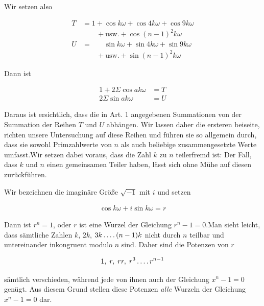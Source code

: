 Wir setzen also

\[
\begin{aligned}
T&=1+\cos k\omega+\cos4k\omega+\cos9k\omega\\&\qquad+\text{usw.}+\cos(n-1)^2k\omega\\
U&=\phantom{1+}\sin k\omega+\sin4k\omega+\sin9k\omega\\&\qquad+\text{usw.}+\sin(n-1)^2k\omega
\end{aligned}
\]

Dann ist

\[
\begin{aligned}
1+2\Sigma\cos ak\omega&=T\\
2\Sigma\sin ak\omega&=U
\end{aligned}
\]

Daraus ist ersichtlich, dass die in Art. 1 angegebenen Summationen von der Summation der Reihen $T$ und $U$ abhängen. Wir lassen daher die ersteren beiseite, richten unsere Untersuchung auf diese Reihen und führen sie so allgemein durch, dass sie sowohl Primzahlwerte von $n$ als auch beliebige zusammengesetzte Werte umfasst.\quad Wir setzen dabei voraus, dass die Zahl $k$ zu $n$ teilerfremd ist: Der Fall, dass $k$ und $n$ einen gemeinsamen Teiler haben, lässt sich ohne Mühe auf diesen zurückführen.


Wir bezeichnen die imaginäre Größe $\surd{-1}$ mit $i$ und setzen

\[
\begin{aligned}
\cos k\omega+i\sin k\omega=r
\end{aligned}
\]

Dann ist $r^n=1$, oder $r$ ist eine Wurzel der Gleichung $r^n-1=0$.\quad Man sieht leicht, dass sämtliche Zahlen $k$, $2k$, $3k\mathinner{.\,.\,.\,.}(n-1)k$ nicht durch $n$ teilbar und untereinander inkongruent modulo $n$ sind. Daher sind die Potenzen von $r$

\[
\begin{aligned}
1,\;r,\;rr,\;r^3\mathinner{.\,.\,.\,.} r^{n-1}
\end{aligned}
\]

sämtlich verschieden, während jede von ihnen auch der Gleichung $x^n-1=0$ genügt. Aus diesem Grund stellen diese Potenzen \emph{alle} Wurzeln der Gleichung $x^n-1=0$ dar.

